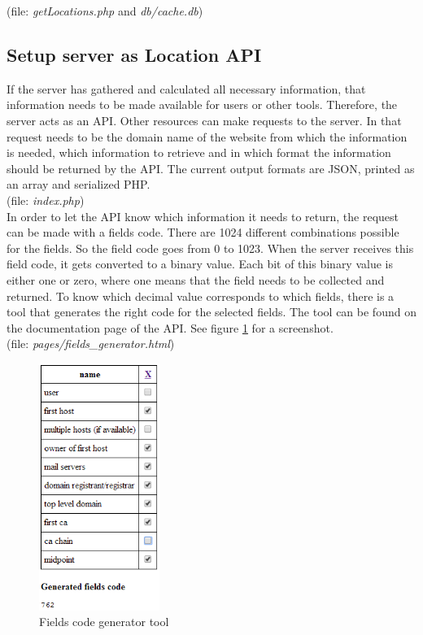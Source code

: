 \documentclass[twoside,openright,notitlepage]{uva-bachelor-thesis}
\begin{document}
(file: \emph{getLocations.php} and \emph{db/cache.db})

\subsection{Setup server as Location API}
If the server has gathered and calculated all necessary information, that information needs to be made available for users or other tools. Therefore, the server acts as an API. Other resources can make requests to the server. In that request needs to be the domain name of the website from which the information is needed, which information to retrieve and in which format the information should be returned by the API. The current output formats are JSON, printed as an array and serialized PHP. \\

(file: \emph{index.php}) \\

In order to let the API know which information it needs to return, the request can be made with a fields code. There are 1024 different combinations possible for the fields. So the field code goes from 0 to 1023. When the server receives this field code, it gets converted to a binary value. Each bit of this binary value is either one or zero, where one means that the field needs to be collected and returned. To know which decimal value corresponds to which fields, there is a tool that generates the right code for the selected fields. The tool can be found on the documentation page of the API. See figure \ref{fig:field_generator} for a screenshot. \\

(file: \emph{pages/fields\_generator.html})

\begin{figure}[h!]
    \centering
    \includegraphics[width=0.35\textwidth, center]{img/code_generator.png}
    \caption{Fields code generator tool}
    \label{fig:field_generator}
\end{figure}
\end{document}
